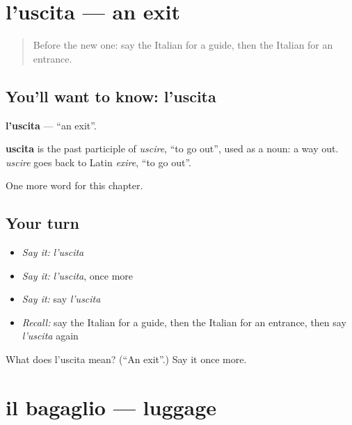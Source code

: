 \section[l'uscita]{l'uscita — an exit}

\label{lesson:IT-C227-uscita}



\begin{quote}
Before the new one: say the Italian for a guide, then the Italian for an entrance.
\end{quote}

\subsection*{You'll want to know: l'uscita}
\textbf{l'uscita} — \textquotedblleft{}an exit\textquotedblright{}.

\begin{cousinweb}
\textbf{uscita} is the past participle of \emph{uscire}, \textquotedblleft{}to go out\textquotedblright{}, used as a noun: a way out. \emph{uscire} goes back to Latin \emph{exire}, \textquotedblleft{}to go out\textquotedblright{}.
\end{cousinweb}

\begin{grammarlens}[title={What you've built}]
One more word for this chapter.
\end{grammarlens}

\subsection*{Your turn}
\begin{itemize}
\raggedright
  \item \emph{Say it:} \emph{l'uscita}
  \item \emph{Say it:} \emph{l'uscita}, once more
  \item \emph{Say it:} say \emph{l'uscita}
  \item \emph{Recall:} say the Italian for a guide, then the Italian for an entrance, then say \emph{l'uscita} again
\end{itemize}

\begin{tcolorbox}[breakable,colback=teal!4,colframe=teal!35!black,title={Before you move on}]
What does l'uscita mean? (\textquotedblleft{}An exit\textquotedblright{}.) Say it once more.
\end{tcolorbox}
\section[il bagaglio]{il bagaglio — luggage}

